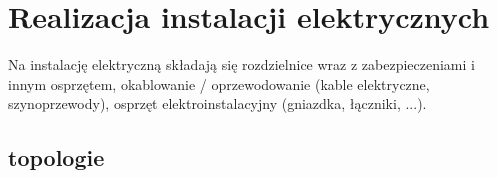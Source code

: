 % 
% 
% 
% 

\section{Realizacja instalacji elektrycznych}

Na instalację elektryczną składają się rozdzielnice wraz z zabezpieczeniami i innym osprzętem, okablowanie / oprzewodowanie (kable elektryczne, szynoprzewody), osprzęt elektroinstalacyjny (gniazdka, łączniki, ...).

\subsection{topologie}


